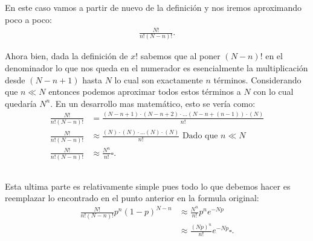 \documentclass{report}
\begin{document}
\section{}

En este caso vamos a partir de nuevo de la definición y nos iremos aproximando poco a poco:
\begin{align*}
  \frac{N!}{n!\left( N - n \right)!}
.\end{align*}

Ahora bien, dada la definición de $x!$ sabemos que al poner $\left( N - n \right)!$ en el denominador lo que nos queda en el numerador es esencialmente la multiplicación desde $\left( N - n + 1 \right) $ hasta $N$ lo cual son exactamente  $n$ términos. Considerando que $n \ll N$ entonces podemos aproximar todos estos términos a $N$ con lo cual quedaría  $N^{n}$. En un desarrollo mas matemático, esto se vería como:
\begin{align*}
  \frac{N!}{n!\left( N - n \right)!} &= \frac{\left( N - n + 1 \right) \cdot \left( N - n + 2 \right) \cdot \ldots \left( N - n + (n - 1) \right)  \cdot \left( N \right) }{n!} \\
  \frac{N!}{n!\left( N - n \right)!} &\approx \frac{\left( N \right) \cdot \left( N  \right) \cdot \ldots \left( N  \right)  \cdot \left( N \right) }{n!} \text{ Dado que } n \ll N\\
  \frac{N!}{n!\left( N - n \right)!} &\approx \frac{N^{n}}{n!} \square
.\end{align*}

\section{}

Esta ultima parte es relativamente simple pues todo lo que debemos hacer es reemplazar lo encontrado en el punto anterior en la formula original:
\begin{align*}
  \frac{N!}{n!\left( N - n \right)!} p^{n}\left( 1 - p \right)^{N - n} &\approx \frac{N^{n}}{n!}p^n e^{-Np}\\
  & \approx \frac{\left(Np\right)^n}{n!}e^{-Np} \square
.\end{align*}

\chapter{}

\section{}
\end{document}
